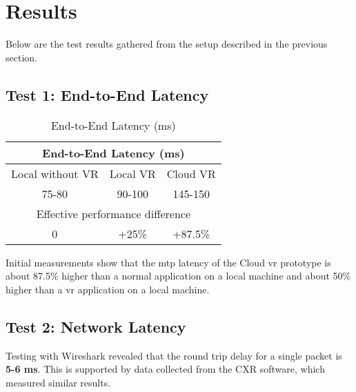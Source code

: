\section{Results}
Below are the test results gathered from the setup described in the previous section.

\subsection{Test 1: End-to-End Latency}
\begin{table}[h]
\begin{center}
\caption{End-to-End Latency (ms)}
\begin{tabular}{ |c|c|c| }
\hline
\multicolumn{3}{|c|}{End-to-End Latency (ms)}\\
\hline
Local without VR & Local VR & Cloud VR\\
\hline
75-80 & 90-100 & 145-150\\
\hline
\multicolumn{3}{|c|}{Effective performance difference}\\
\hline
0 & +25\% & +87.5\%\\
\hline
\end{tabular}
\end{center}
\end{table}

Initial measurements show that the \acrshort{mtp} latency of the Cloud \acrshort{vr} prototype is about 87.5\% higher than a normal application on a local machine and about 50\% higher than a \acrshort{vr} application on a local machine.

\subsection{Test 2: Network Latency}
Testing with Wireshark \parencite{wireshark} revealed that the round trip delay for a single packet is \textbf{5-6 ms}. This is supported by data collected from the CXR \parencite{cloudxr} software, which measured similar results. 